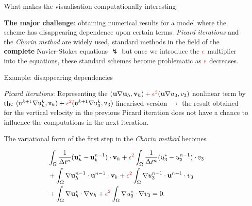 \documentclass{beamer}
\begin{document}
\begin{frame}{What makes the visualisation computationally interesting}

\textbf{The major challenge}: \textcolor{mediumred-violet}{obtaining numerical results for a model where the scheme has disappearing dependence upon certain terms}. \textit{Picard iterations} and the \textit{Chorin method} are widely used, standard methods in the field of the \textbf{complete} Navier-Stokes equations $\lightning$ but once we introduce the $\textcolor{jasper}{\epsilon}$ multiplier into the equations, these standard schemes become problematic as $\textcolor{jasper}{\epsilon}$ decreases.

\end{frame}

\begin{frame}{Example: disappearing dependencies}

\textit{Picard iterations}: Representing the $(\mathbf{u} \nabla \mathbf{u}_h, \mathbf{v}_h) + \textcolor{jasper}{\epsilon^2} ( \mathbf{u} \nabla u_3, v_3)$ nonlinear term by the $( \texttt{u}^{k+1} \nabla \texttt{u}_h^k, \texttt{v}_h ) + \textcolor{jasper}{\epsilon^2} (\texttt{u}^{k+1} \nabla \texttt{u}_3^k, \texttt{v}_3 )$ linearised version $\to$ the result obtained for the vertical velocity in the previous Picard iteration does not have a chance to influence the computations in the next iteration.

The variational form of the first step in the \textit{Chorin method} becomes

\begin{equation} \nonumber
\begin{split}
& \int_\Omega \frac{1}{\Delta t^n} (\mathbf{u}_h^* - \mathbf{u}_h^{n-1}) \cdot \mathbf{v}_h + \textcolor{jasper}{\epsilon^2} \int_\Omega \frac{1}{\Delta t^n} (u_3^* - u_3^{n-1}) \cdot v_3 \\
& + \int_\Omega \nabla \mathbf{u}_h^{n-1} \cdot \mathbf{u}^{n-1} \cdot \mathbf{v}_h + \textcolor{jasper}{\epsilon^2} \int_\Omega \nabla u_3^{n-1} \cdot \mathbf{u}^{n-1} \cdot v_3 \\
& + \int_\Omega \nabla \mathbf{u}_h^* \cdot \nabla \mathbf{v}_h + \textcolor{jasper}{\epsilon^2} \int_\Omega \nabla u_3^* \cdot \nabla v_3 = 0.
\end{split}
\end{equation}

\end{frame}
\end{document}
